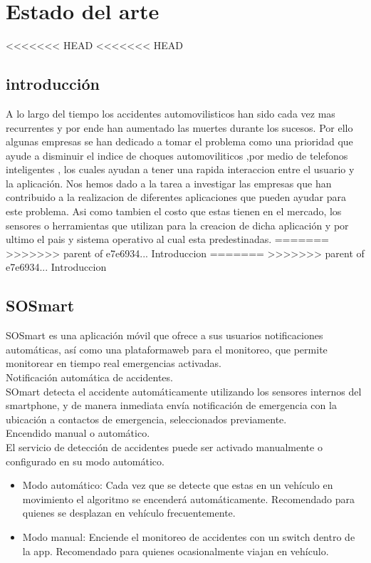 \section{Estado del arte}

<<<<<<< HEAD
<<<<<<< HEAD
\subsection{introducción}

A lo largo del tiempo los  accidentes automovilisticos han sido cada vez mas recurrentes y por ende han aumentado las muertes durante los sucesos. Por ello algunas empresas se han dedicado a tomar el problema como una prioridad que ayude a disminuir el indice de choques automoviliticos ,por medio de telefonos inteligentes , los cuales ayudan a tener una rapida interaccion entre el usuario y la aplicación.
Nos hemos dado a la tarea a investigar las empresas que han contribuido a la realizacion de diferentes aplicaciones que pueden ayudar para este problema. Asi como tambien el costo que estas tienen en el mercado, los sensores o herramientas que utilizan para la creacion de dicha aplicación y por ultimo el pais y sistema operativo al cual esta predestinadas.
=======
>>>>>>> parent of e7e6934... Introduccion
=======
>>>>>>> parent of e7e6934... Introduccion

\subsection{SOSmart}
SOSmart es una aplicación móvil que ofrece a sus usuarios notificaciones automáticas, así como una plataformaweb para el monitoreo, que permite monitorear en tiempo real emergencias activadas.\\

Notificación automática de accidentes.\\
SOmart detecta el accidente automáticamente utilizando los sensores internos del smartphone, y de manera inmediata envía notificación de emergencia con la ubicación a contactos de emergencia, seleccionados previamente.\\

Encendido manual o automático.\\
El servicio de detección de accidentes puede ser activado manualmente o configurado en su modo automático.
\begin{itemize}
	\item Modo automático: Cada vez que se detecte que estas en un vehículo en movimiento el algoritmo se encenderá automáticamente. Recomendado para quienes se desplazan en vehículo frecuentemente.
	
	\item Modo manual: Enciende el monitoreo de accidentes con un switch dentro de la app. Recomendado para quienes ocasionalmente viajan en vehículo.\\
\end{itemize}


